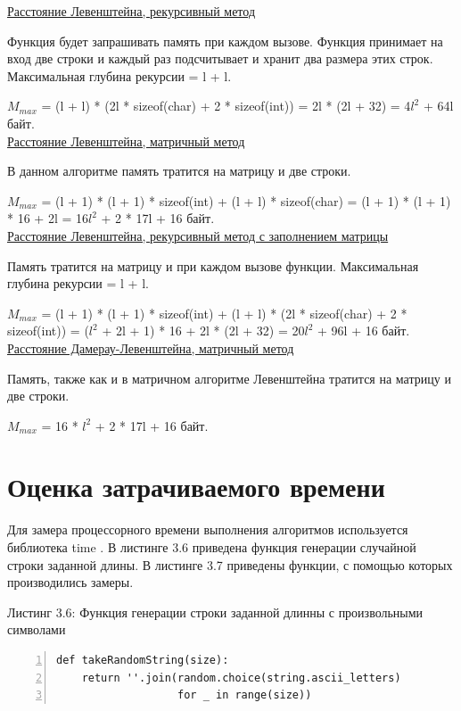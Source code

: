 \documentclass[12pt,a4paper]{report}
\begin{document}
\underline{Расстояние Левенштейна, рекурсивный метод}

Функция будет запрашивать память при каждом вызове. Функция принимает на вход две строки и каждый раз 
подсчитывает и хранит два размера этих строк. Максимальная глубина рекурсии = l + l.

$M_{max}$ = (l + l) * (2l * sizeof(char) + 2 * sizeof(int)) = 2l * (2l + 32) = 4$l^2$ + 64l байт. \\

\underline{Расстояние Левенштейна, матричный метод}

В данном алгоритме память тратится на матрицу и две строки.

$M_{max}$ = (l + 1) * (l + 1) * sizeof(int) + (l + l) * sizeof(char) = (l + 1) * (l + 1) * 16 + 2l = 
16$l^2$ + 2 * 17l + 16 байт. \\

\underline{Расстояние Левенштейна, рекурсивный метод с заполнением матрицы}

Память тратится на матрицу и при каждом вызове функции. Максимальная глубина рекурсии = l + l.

$M_{max}$ = (l + 1) * (l + 1) * sizeof(int) + (l + l) * (2l * sizeof(char) + 2 * sizeof(int)) = ($l^2$ + 
2l + 1) * 16 + 2l * (2l + 32) = 20$l^2$ + 96l + 16 байт. \\

\underline{Расстояние Дамерау-Левенштейна, матричный метод}

Память, также как и в матричном алгоритме Левенштейна тратится на матрицу и две строки.

$M_{max}$ = 16 * $l^2$ + 2 * 17l + 16 байт. \\

\section{Оценка затрачиваемого времени}

Для замера процессорного времени выполнения алгоритмов используется библиотека time \cite{time_bib}. В листинге 3.6 
приведена функция генерации случайной строки заданной длины. В листинге 3.7 приведены функции, с 
помощью которых производились замеры.

\newpage
\textrm{Листинг 3.6: Функция генерации строки заданной длинны с произвольными символами}
\begin{lstlisting}[frame=single, numbers=left]
def takeRandomString(size):
    return ''.join(random.choice(string.ascii_letters) 
                   for _ in range(size))
\end{lstlisting}
\end{document}
